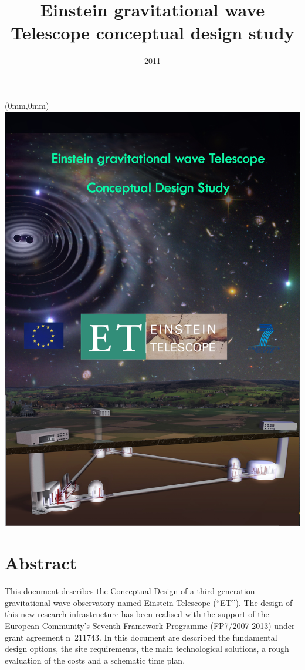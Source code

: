 \documentclass[color,DIV12,pdftex,a4paper]{ET-DS}
\title{Einstein gravitational wave Telescope conceptual design study} \shorttitle{ET Design Study}
\date{2011}
\begin{document}
\begin{textblock*}{300mm}(0mm,0mm)   \includegraphics[width=\paperwidth]{Sec_Conclusions/FirstPagelatest4.jpg}
\end{textblock*}
%
%
\begin{titlepage}
\maketitle
\end{titlepage}
\clearpage
%
\FloatBarrier
%
\section*{Abstract}
This document describes the Conceptual Design of a third generation gravitational wave observatory named Einstein Telescope (``ET''). The design of this new research infrastructure has been realised with the support of the European Community's Seventh Framework
Programme (FP7/2007-2013) under grant agreement n~211743.  In this document are described the fundamental design options, the site requirements, the main technological solutions, a rough evaluation of the costs and a schematic time plan.
%
\vspace{1cm}
\end{document}

